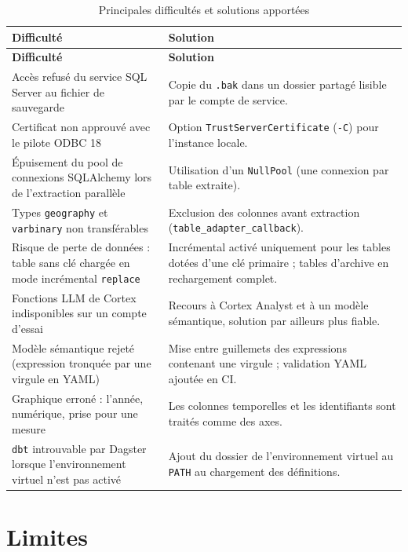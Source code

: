 \begin{longtable}{@{}p{5.6cm}p{8.9cm}@{}}
\caption{Principales difficultés et solutions apportées}
\label{tab:difficultes}\\
\toprule
\textbf{Difficulté} & \textbf{Solution} \\
\midrule
\endfirsthead
\toprule
\textbf{Difficulté} & \textbf{Solution} \\
\midrule
\endhead
Accès refusé du service SQL Server au fichier de sauvegarde &
  Copie du \texttt{.bak} dans un dossier partagé lisible par le compte de service. \\
\addlinespace
Certificat non approuvé avec le pilote ODBC 18 &
  Option \texttt{TrustServerCertificate} (\texttt{-C}) pour l'instance locale. \\
\addlinespace
Épuisement du pool de connexions SQLAlchemy lors de l'extraction parallèle &
  Utilisation d'un \texttt{NullPool} (une connexion par table extraite). \\
\addlinespace
Types \texttt{geography} et \texttt{varbinary} non transférables &
  Exclusion des colonnes avant extraction (\texttt{table\_adapter\_callback}). \\
\addlinespace
Risque de perte de données : table sans clé chargée en mode incrémental \texttt{replace} &
  Incrémental activé uniquement pour les tables dotées d'une clé primaire ; tables d'archive en
  rechargement complet. \\
\addlinespace
Fonctions LLM de Cortex indisponibles sur un compte d'essai &
  Recours à Cortex Analyst et à un modèle sémantique, solution par ailleurs plus fiable. \\
\addlinespace
Modèle sémantique rejeté (expression tronquée par une virgule en YAML) &
  Mise entre guillemets des expressions contenant une virgule ; validation YAML ajoutée en CI. \\
\addlinespace
Graphique erroné : l'année, numérique, prise pour une mesure &
  Les colonnes temporelles et les identifiants sont traités comme des axes. \\
\addlinespace
\texttt{dbt} introuvable par Dagster lorsque l'environnement virtuel n'est pas activé &
  Ajout du dossier de l'environnement virtuel au \texttt{PATH} au chargement des définitions. \\
\bottomrule
\end{longtable}

\section{Limites}

